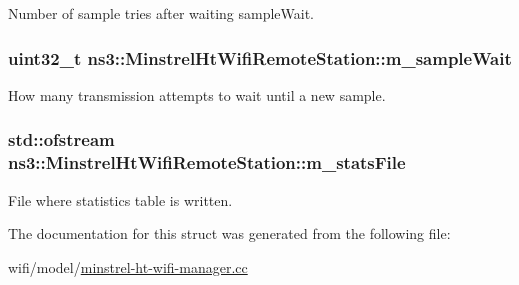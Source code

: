 Number of sample tries after waiting sample\+Wait. 

\subsubsection[{\texorpdfstring{m\+\_\+sample\+Wait}{m_sampleWait}}]{\setlength{\rightskip}{0pt plus 5cm}uint32\+\_\+t ns3\+::\+Minstrel\+Ht\+Wifi\+Remote\+Station\+::m\+\_\+sample\+Wait}\hypertarget{structns3_1_1MinstrelHtWifiRemoteStation_a89693de90690a2254cc6800df2cae538}{}\label{structns3_1_1MinstrelHtWifiRemoteStation_a89693de90690a2254cc6800df2cae538}


How many transmission attempts to wait until a new sample. 

\subsubsection[{\texorpdfstring{m\+\_\+stats\+File}{m_statsFile}}]{\setlength{\rightskip}{0pt plus 5cm}std\+::ofstream ns3\+::\+Minstrel\+Ht\+Wifi\+Remote\+Station\+::m\+\_\+stats\+File}\hypertarget{structns3_1_1MinstrelHtWifiRemoteStation_a4ad1f44b846f876f6f6e65ffc7bf723d}{}\label{structns3_1_1MinstrelHtWifiRemoteStation_a4ad1f44b846f876f6f6e65ffc7bf723d}


File where statistics table is written. 



The documentation for this struct was generated from the following file\+:\begin{DoxyCompactItemize}
\item 
wifi/model/\hyperlink{minstrel-ht-wifi-manager_8cc}{minstrel-\/ht-\/wifi-\/manager.\+cc}\end{DoxyCompactItemize}
